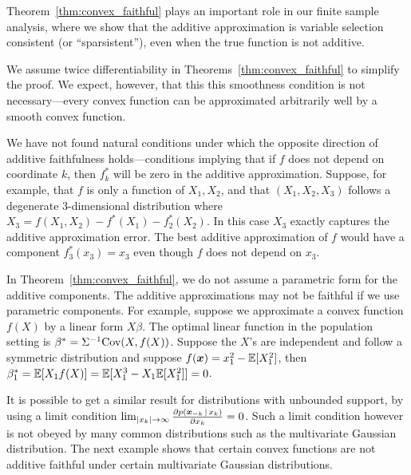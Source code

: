 Theorem~\ref{thm:convex_faithful} plays an important role in our
finite sample analysis, where we show that the additive
approximation is variable selection consistent (or ``sparsistent''), even when the true function is not
additive.


\begin{remark}
  We assume twice differentiability in
  Theorems~\ref{thm:convex_faithful} to simplify the proof.  We
  expect, however, that this this smoothness condition is not
  necessary---every convex function can be approximated arbitrarily
  well by a smooth convex function.
\end{remark}


\begin{remark} 
  We have not found natural conditions under which the opposite
  direction of additive faithfulness holds---conditions implying that if $f$ does not
  depend on coordinate $k$, then $f_k^*$ will be zero in the additive
  approximation.  Suppose, for example, that $f$ is only a
  function of $X_1, X_2$, and that $(X_1, X_2, X_3)$ follows a
  degenerate 3-dimensional distribution where $X_3 = f(X_1, X_2) -
  f^*(X_1) - f^*_2(X_2)$.  In this case $X_3$ exactly captures the
  additive approximation error.  The best additive
  approximation of $f$ would have a component $f^*_3(x_3) = x_3$ even
  though $f$ does not depend on $x_3$.
\end{remark}


\begin{remark}
In Theorem~\ref{thm:convex_faithful}, we do not assume a parametric form for the additive components. The additive approximations may not be faithful if we use parametric components. For example, suppose we approximate a convex function $f(X)$ by a linear form $X \beta$. The optimal linear function in the population setting is $\beta^* = \Sigma^{-1} \textrm{Cov}(X, f(X))$. Suppose the $X$'s are independent and follow a symmetric distribution and suppose $f(\mbox{\boldmath $x$}) = x_1^2 - {\mathbb E}[X_1^2]$, then $\beta^*_1 = {\mathbb E}[ X_1 f(X)] = {\mathbb E}[ X_1^3 - X_1 {\mathbb E}[X_1^2]] = 0$.
\end{remark}


\begin{remark}
It is possible to get a similar result for distributions with
unbounded support, by using a limit condition $\lim_{|x_k| \rightarrow
  \infty} \frac{\partial p(\mbox{\boldmath $\scriptstyle x$}_{-k} {\,|\,} x_k)}{\partial x_k}
= 0$.  Such a limit condition however is not obeyed by many common distributions such as the multivariate Gaussian distribution. The next example shows that certain convex functions are not additive faithful under certain multivariate Gaussian distributions.
\end{remark}

